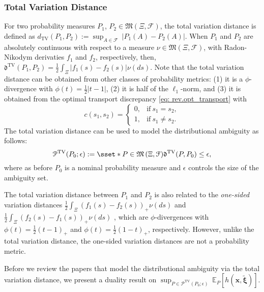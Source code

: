 \documentclass[final,onefignum,onetabnum]{class}
\newcommand{\ee}[2]{\mathbb{E}_{#1} \left[ #2 \right]}
\newcommand{\bs}[1]{\boldsymbol{#1}} %
\newcommand{\Cs}[1]{\mathcal{#1}} %
\newcommand{\Fs}[1]{\mathfrak{#1}} %
\newcommand{\txi}{\tilde{\bs{\xi}}}
\newcommand{\measurespace}{\left( \Xi, \Cs{F} \right)}
\begin{document}
\subsubsection{Total Variation Distance} 
For two probability measures $P_{1}$, $P_{2} \in \Fs{M}\measurespace$, the total variation distance is defined as $d_{\text{TV}}(P_{1},P_{2}):=\sup_{A \in \Cs{F}} \ |P_{1}(A)-P_{2}(A)|$. When  $P_{1}$ and $P_{2}$ are absolutely continuous with respect to a measure $\nu \in \Fs{M}\measurespace$, with Radon-Nikodym derivaties $f_{1}$ and $f_{2}$, respectively, then, $\Fs{d}^{\text{TV}}(P_{1},P_{2})=\frac{1}{2} \int_{\Xi} |f_{1}(s)-f_{2}(s)| \nu(ds)$. 
Note that the total variation distance can be obtained from other classes of probability metrics: (1) it is a $\phi$-divergence with  $\phi(t)=\frac{1}{2}|t-1|$, (2) it is half of the $\ell_{1}$-norm, and (3) it is obtained from the optimal transport discrepancy \eqref{eq: rev.opt_transport} with 
\begin{equation}
    c(s_{1},s_{2})=\begin{cases} 0, & \text{if} \ s_{1}=s_{2},\\
1, & \text{if} \ s_{1} \neq s_{2}.
\end{cases}
\end{equation} 
The total variation distance can be used to model the distributional ambiguity as follows:
\begin{equation}
\label{eq: rev.tv_set}
\Cs{P}^{\text{TV}}(P_{0};\epsilon):= \sset*{P \in \Fs{M}\measurespace}{ \Fs{d}^{\text{TV}}(P,P_{0}) \le \epsilon},
\end{equation}
where as before $P_{0}$ is a nominal probability measure and $\epsilon$ controls the size of the ambiguity set. 

The total variation distance  between $P_{1}$ and $ P_{2}$ is also related to the {\it one-sided} variation distances $\frac{1}{2} \int_{\Xi} (f_{1}(s)-f_{2}(s))_{+} \nu(ds)$ and $\frac{1}{2} \int_{\Xi} (f_{2}(s)-f_{1}(s))_{+} \nu(ds)$ \cite{rahimian2019}, which are $\phi$-divergences with  $\phi(t)=\frac{1}{2}(t-1)_{+}$ and $\phi(t)=\frac{1}{2}(1-t)_{+}$, respectively. However, unlike the total variation distance, the one-sided variation distances are not a probability metric. 

Before we review the papers that model the distributional ambiguity via the total variation distance, we present a  duality result on $\sup_{P \in \Cs{P}^{\text{TV}}(P_{0};\epsilon)} \ \ee{P}{h(\bs{x},\txi)}$. 
\end{document}
